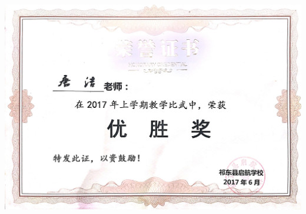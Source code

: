\documentclass[UFT8]{ctexart}%
\begin{document}
\begin{center}
 \includegraphics[scale=0.16]{figs/201706.JPG }
\end{center}
\end{document}
